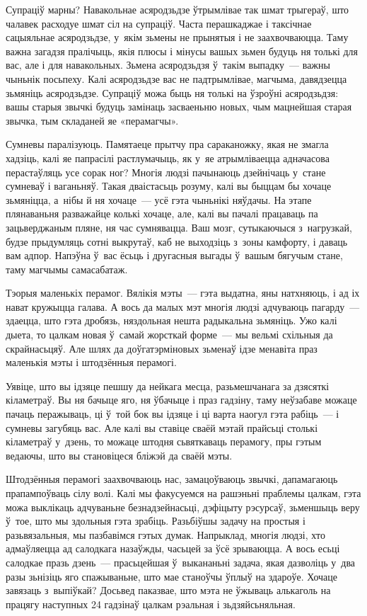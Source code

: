 Супраціў марны? Навакольнае асяродзьдзе ўтрымлівае так шмат трыгераў, што чалавек расходуе шмат сіл на супраціў. Часта перашкаджае і таксічнае сацыяльнае асяродзьдзе, у~якім зьмены не прынятыя і не заахвочваюцца. Таму важна загадзя пралічыць, якія плюсы і мінусы вашых зьмен будуць ня толькі для вас, але і для навакольных. Зьмена асяродзьдзя ў~такім выпадку~--- важны чыньнік посьпеху. Калі асяродзьдзе вас не падтрымлівае, магчыма, давядзецца зьмяніць асяродзьдзе. Супраціў можа быць ня толькі на ўзроўні асяродзьдзя: вашы старыя звычкі будуць замінаць засваеньню новых, чым мацнейшая старая звычка, тым складаней яе «перамагчы».

Сумневы паралізуюць. Памятаеце прытчу пра сараканожку, якая не змагла хадзіць, калі яе папрасілі растлумачыць, як у~яе атрымліваецца адначасова перастаўляць усе сорак ног? Многія людзі пачынаюць дзейнічаць у~стане сумневаў і ваганьняў. Такая дваістасьць розуму, калі вы быццам бы хочаце зьмяніцца, а~нібы й ня хочаце~--- усё гэта чыньнікі няўдачы. На этапе плянаваньня разважайце колькі хочаце, але, калі вы пачалі працаваць па зацьверджаным пляне, ня час сумнявацца. Ваш мозг, сутыкаючыся з~нагрузкай, будзе прыдумляць сотні выкрутаў, каб не выходзіць з~зоны камфорту, і даваць вам адпор. Напэўна ў~вас ёсьць і другасныя выгады ў~вашым бягучым стане, таму магчымы самасабатаж.

Тэорыя маленькіх перамог. Вялікія мэты~--- гэта выдатна, яны натхняюць, і ад іх нават кружыцца галава. А вось да малых мэт многія людзі адчуваюць пагарду~--- здаецца, што гэта дробязь, няздольная нешта радыкальна зьмяніць. Ужо калі дыета, то цалкам новая ў~самай жорсткай форме~--- мы вельмі схільныя да скрайнасьцяў. Але шлях да доўгатэрміновых зьменаў ідзе менавіта праз маленькія мэты і штодзённыя перамогі.

Уявіце, што вы ідзяце пешшу да нейкага месца, разьмешчанага за дзясяткі кіламетраў. Вы ня бачыце яго, ня ўбачыце і праз гадзіну, таму неўзабаве можаце пачаць перажываць, ці ў~той бок вы ідзяце і ці варта наогул гэта рабіць~--- і сумневы загубяць вас. Але калі вы ставіце сваёй мэтай прайсьці столькі кіламетраў у~дзень, то можаце штодня сьвяткаваць перамогу, пры гэтым ведаючы, што вы становіцеся бліжэй да сваёй мэты.

Штодзённыя перамогі заахвочваюць нас, замацоўваюць звычкі, дапамагаюць прапампоўваць сілу волі. Калі мы факусуемся на рашэньні праблемы цалкам, гэта можа выклікаць адчуваньне безнадзейнасьці, дэфіцыту рэсурсаў, зьменшыць веру ў~тое, што мы здольныя гэта зрабіць. Разьбіўшы задачу на простыя і разьвязальныя, мы пазбавімся гэтых думак. Напрыклад, многія людзі, хто адмаўляецца ад салодкага назаўжды, часьцей за ўсё зрываюцца. А вось есьці салодкае празь дзень~--- прасьцейшая ў~выкананьні задача, якая дазволіць у~два разы зьнізіць яго спажываньне, што мае станоўчы ўплыў на здароўе. Хочаце завязаць з~выпіўкай? Досьвед паказвае, што мэта не ўжываць алькаголь на працягу наступных 24 гадзінаў цалкам рэальная і зьдзяйсьняльная.

